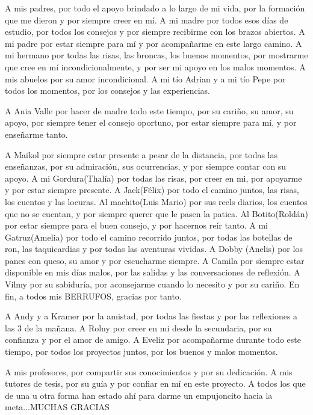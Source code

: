 \begin{acknowledgements}
    A mis padres, por todo el apoyo brindado a lo largo de mi vida, por la formación que me dieron
    y por siempre creer en mí. A mi madre por todos esos días de estudio, por todos los consejos y por siempre
    recibirme con los brazos abiertos. A mi padre por estar siempre para mí y por acompañarme en este largo
    camino. A mi hermano por todas las risas, las broncas, los buenos momentos, por mostrarme que cree
    en mí incondicionalmente, y por ser mi apoyo en los malos momentos. A mis abuelos por su amor 
    incondicional. A mi tío Adrian y a mi tío Pepe por todos los momentos, por los consejos y las experiencias.
    
    A Ania Valle por hacer de madre todo este tiempo, por su cariño, su amor, su apoyo, por siempre tener 
    el consejo oportuno, por estar siempre para mí, y por enseñarme tanto.

    A Maikol por siempre estar presente a pesar de la distancia, por todas las enseñanzas, por su admiración, sus ocurrencias,
    y por siempre contar con su apoyo. A mi Gordura(Thalía) por todas las risas, por creer en mi, por apoyarme 
    y por estar siempre presente. A Jack(Félix) por todo el camino juntos, las risas, los cuentos y las locuras. Al machito(Luis Mario)
    por sus reels diarios, los cuentos que no se cuentan, y por siempre querer que le pasen la patica. Al Botito(Roldán) por estar siempre
    para el buen consejo, y por hacernos reír tanto. A mi Gatruz(Amelia) por todo el camino recorrido juntos, por todas las botellas de ron, las taquicardias y
    por todas las aventuras vividas. A Dobby (Anelis) por los panes con queso, su amor y por escucharme
    siempre. A Camila por siempre estar disponible en mis días malos, por las salidas y las conversaciones de reflexión. A Vilmy
    por su sabiduría, por aconsejarme cuando lo necesito y por su cariño. En fin, a todos mis BERRUFOS, gracias por tanto.

    A Andy y a Kramer por la amistad, por todas las fiestas y por las reflexiones a las 3 de la mañana.
    A Rolny por creer en mi desde la secundaria, por su confianza y por el amor de amigo. A Eveliz por acompañarme
    durante todo este tiempo, por todos los proyectos juntos, por los buenos y malos momentos.

    A mis profesores, por compartir sus conocimientos y por su dedicación.
    A mis tutores de tesis, por su guía y por confiar en mí en este proyecto.
    A todos los que de una u otra forma han estado ahí para darme un empujoncito hacia
    la meta...MUCHAS GRACIAS
    
\end{acknowledgements}